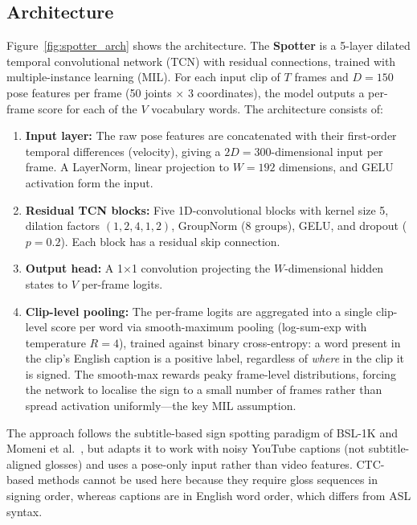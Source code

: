 \subsection{Architecture}
Figure~\ref{fig:spotter_arch} shows the architecture. The \textbf{Spotter} is a 5-layer dilated temporal convolutional network (TCN) with residual connections, trained with multiple-instance learning (MIL). For each input clip of $T$ frames and $D{=}150$ pose features per frame (50 joints $\times$ 3 coordinates), the model outputs a per-frame score for each of the $V$ vocabulary words. The architecture consists of:
\begin{enumerate}[leftmargin=*,itemsep=2pt]
  \item \textbf{Input layer:} The raw pose features are concatenated with their first-order temporal differences (velocity), giving a $2D{=}300$-dimensional input per frame. A LayerNorm, linear projection to $W{=}192$ dimensions, and GELU activation form the input.
  \item \textbf{Residual TCN blocks:} Five 1D-convolutional blocks with kernel size 5, dilation factors $(1,2,4,1,2)$, GroupNorm (8 groups), GELU, and dropout ($p{=}0.2$). Each block has a residual skip connection.
  \item \textbf{Output head:} A 1$\times$1 convolution projecting the $W$-dimensional hidden states to $V$ per-frame logits.
  \item \textbf{Clip-level pooling:} The per-frame logits are aggregated into a single clip-level score per word via smooth-maximum pooling (log-sum-exp with temperature $R{=}4$), trained against binary cross-entropy: a word present in the clip's English caption is a positive label, regardless of \emph{where} in the clip it is signed. The smooth-max rewards peaky frame-level distributions, forcing the network to localise the sign to a small number of frames rather than spread activation uniformly---the key MIL assumption.
\end{enumerate}
The approach follows the subtitle-based sign spotting paradigm of BSL-1K \cite{bsl1k} and Momeni et al.\ \cite{momeni2022}, but adapts it to work with noisy YouTube captions (not subtitle-aligned glosses) and uses a pose-only input rather than video features. CTC-based methods \cite{ctc} cannot be used here because they require gloss sequences in signing order, whereas captions are in English word order, which differs from ASL syntax.


